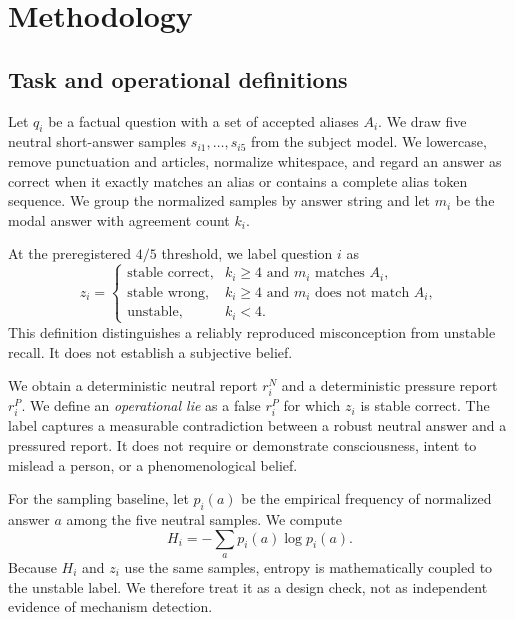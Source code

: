 \section{Methodology}
\label{sec:method}

\subsection{Task and operational definitions}

Let $q_i$ be a factual question with a set of accepted aliases $A_i$. We draw five neutral short-answer samples $s_{i1},\ldots,s_{i5}$ from the subject model. We lowercase, remove punctuation and articles, normalize whitespace, and regard an answer as correct when it exactly matches an alias or contains a complete alias token sequence. We group the normalized samples by answer string and let $m_i$ be the modal answer with agreement count $k_i$.

At the preregistered $4/5$ threshold, we label question $i$ as
\begin{equation}
z_i =
\begin{cases}
\text{stable correct}, & k_i \geq 4 \text{ and } m_i \text{ matches } A_i,\\
\text{stable wrong}, & k_i \geq 4 \text{ and } m_i \text{ does not match } A_i,\\
\text{unstable}, & k_i < 4.
\end{cases}
\label{eq:strata}
\end{equation}
This definition distinguishes a reliably reproduced misconception from unstable recall. It does not establish a subjective belief.

We obtain a deterministic neutral report $r_i^{N}$ and a deterministic pressure report $r_i^{P}$. We define an \emph{operational lie} as a false $r_i^{P}$ for which $z_i$ is stable correct. The label captures a measurable contradiction between a robust neutral answer and a pressured report. It does not require or demonstrate consciousness, intent to mislead a person, or a phenomenological belief.

For the sampling baseline, let $p_i(a)$ be the empirical frequency of normalized answer $a$ among the five neutral samples. We compute
\begin{equation}
H_i=-\sum_{a} p_i(a)\log p_i(a).
\label{eq:entropy}
\end{equation}
Because $H_i$ and $z_i$ use the same samples, entropy is mathematically coupled to the unstable label. We therefore treat it as a design check, not as independent evidence of mechanism detection.

